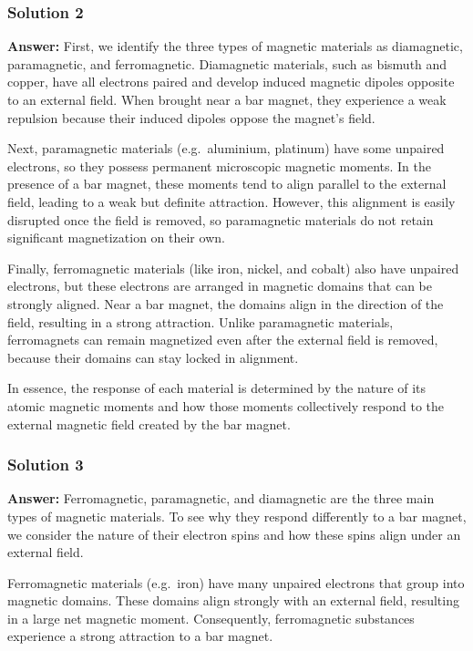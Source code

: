\documentclass{article}
\begin{document}
\subsubsection{Solution 2}
\textbf{Answer:} First, we identify the three types of magnetic materials as diamagnetic, 
paramagnetic, and ferromagnetic. Diamagnetic materials, such as bismuth and copper, have 
all electrons paired and develop induced magnetic dipoles opposite to an external field. 
When brought near a bar magnet, they experience a weak repulsion because their induced 
dipoles oppose the magnet's field. 

Next, paramagnetic materials (e.g.\ aluminium, platinum) have some unpaired electrons, so 
they possess permanent microscopic magnetic moments. In the presence of a bar magnet, 
these moments tend to align parallel to the external field, leading to a weak but definite 
attraction. However, this alignment is easily disrupted once the field is removed, so 
paramagnetic materials do not retain significant magnetization on their own.

Finally, ferromagnetic materials (like iron, nickel, and cobalt) also have unpaired electrons, 
but these electrons are arranged in magnetic domains that can be strongly aligned. Near a 
bar magnet, the domains align in the direction of the field, resulting in a strong attraction. 
Unlike paramagnetic materials, ferromagnets can remain magnetized even after the external 
field is removed, because their domains can stay locked in alignment.

In essence, the response of each material is determined by the nature of its atomic magnetic 
moments and how those moments collectively respond to the external magnetic field created 
by the bar magnet.


\subsubsection{Solution 3}
\textbf{Answer:} Ferromagnetic, paramagnetic, and diamagnetic are the three main types 
of magnetic materials. To see why they respond differently to a bar magnet, we consider 
the nature of their electron spins and how these spins align under an external field.

Ferromagnetic materials (e.g.\ iron) have many unpaired electrons that group into 
magnetic domains. These domains align strongly with an external field, resulting 
in a large net magnetic moment. Consequently, ferromagnetic substances experience 
a strong attraction to a bar magnet.
\end{document}
